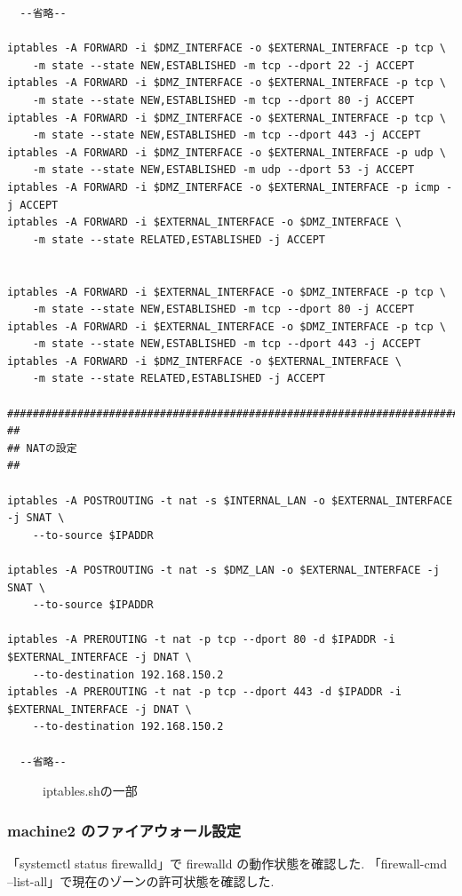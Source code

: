 \documentclass{ltjsarticle} %
\begin{document}
\begin{mdframed}
  \begin{verbatim}
  --省略--

iptables -A FORWARD -i $DMZ_INTERFACE -o $EXTERNAL_INTERFACE -p tcp \
    -m state --state NEW,ESTABLISHED -m tcp --dport 22 -j ACCEPT
iptables -A FORWARD -i $DMZ_INTERFACE -o $EXTERNAL_INTERFACE -p tcp \
    -m state --state NEW,ESTABLISHED -m tcp --dport 80 -j ACCEPT
iptables -A FORWARD -i $DMZ_INTERFACE -o $EXTERNAL_INTERFACE -p tcp \
    -m state --state NEW,ESTABLISHED -m tcp --dport 443 -j ACCEPT
iptables -A FORWARD -i $DMZ_INTERFACE -o $EXTERNAL_INTERFACE -p udp \
    -m state --state NEW,ESTABLISHED -m udp --dport 53 -j ACCEPT
iptables -A FORWARD -i $DMZ_INTERFACE -o $EXTERNAL_INTERFACE -p icmp -j ACCEPT
iptables -A FORWARD -i $EXTERNAL_INTERFACE -o $DMZ_INTERFACE \
    -m state --state RELATED,ESTABLISHED -j ACCEPT


iptables -A FORWARD -i $EXTERNAL_INTERFACE -o $DMZ_INTERFACE -p tcp \
    -m state --state NEW,ESTABLISHED -m tcp --dport 80 -j ACCEPT
iptables -A FORWARD -i $EXTERNAL_INTERFACE -o $DMZ_INTERFACE -p tcp \
    -m state --state NEW,ESTABLISHED -m tcp --dport 443 -j ACCEPT
iptables -A FORWARD -i $DMZ_INTERFACE -o $EXTERNAL_INTERFACE \
    -m state --state RELATED,ESTABLISHED -j ACCEPT

##############################################################################
##
## NATの設定
##

iptables -A POSTROUTING -t nat -s $INTERNAL_LAN -o $EXTERNAL_INTERFACE -j SNAT \
    --to-source $IPADDR

iptables -A POSTROUTING -t nat -s $DMZ_LAN -o $EXTERNAL_INTERFACE -j SNAT \
    --to-source $IPADDR

iptables -A PREROUTING -t nat -p tcp --dport 80 -d $IPADDR -i $EXTERNAL_INTERFACE -j DNAT \
    --to-destination 192.168.150.2
iptables -A PREROUTING -t nat -p tcp --dport 443 -d $IPADDR -i $EXTERNAL_INTERFACE -j DNAT \
    --to-destination 192.168.150.2

  --省略--    
  \end{verbatim}
  \end{mdframed}
  \begin{figure}[H]
  \caption{iptables.shの一部}
  \label{fig:iptables}
\end{figure}

\subsubsection{machine2 のファイアウォール設定}
「systemctl status firewalld」で firewalld の動作状態を確認した. 
「firewall-cmd --list-all」で現在のゾーンの許可状態を確認した. 
\end{document}
